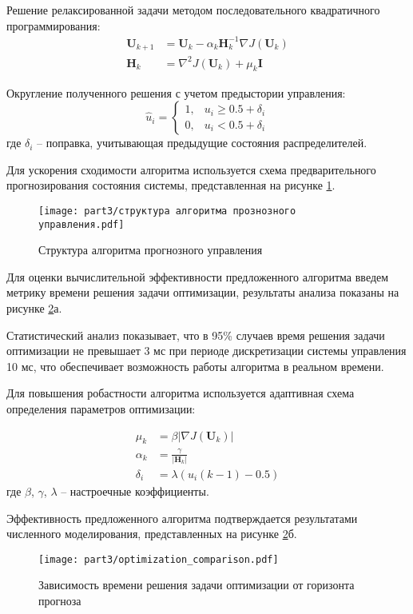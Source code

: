 Решение релаксированной задачи методом последовательного квадратичного программирования:
\begin{equation}
	\begin{aligned}
		\mathbf{U}_{k+1} & = \mathbf{U}_k - \alpha_k \mathbf{H}_k^{-1}\nabla J(\mathbf{U}_k) \\
		\mathbf{H}_k     & = \nabla^2 J(\mathbf{U}_k) + \mu_k\mathbf{I}
	\end{aligned}
\end{equation}

Округление полученного решения с учетом предыстории управления:
\begin{equation}
	\hat{u}_i = \begin{cases}
		1, & u_i \geq 0.5 + \delta_i \\
		0, & u_i < 0.5 + \delta_i
	\end{cases}
\end{equation}
где $\delta_i$ -- поправка, учитывающая предыдущие состояния распределителей.

Для ускорения сходимости алгоритма используется схема предварительного прогнозирования состояния системы, представленная
на рисунке \ref{fig:mpc_structure}.

\begin{figure}[ht]
	\centering
	\texttt{[image: part3/структура алгоритма прознозного управления.pdf]}
	\caption{Структура алгоритма прогнозного управления}\label{fig:mpc_structure}
\end{figure}

Для оценки вычислительной эффективности предложенного алгоритма введем метрику времени решения задачи
оптимизации, результаты анализа показаны на рисунке \ref{fig:opt_compar}а.

Статистический анализ показывает, что в 95\% случаев время решения задачи
оптимизации не превышает 3 мс при периоде дискретизации системы управления
10 мс, что обеспечивает возможность работы алгоритма в реальном времени.

Для повышения робастности алгоритма используется адаптивная схема определения
параметров оптимизации:

\begin{equation}
	\begin{aligned}
		\mu_k    & = \beta|\nabla J(\mathbf{U}_k)| \\
		\alpha_k & = \frac{\gamma}{|\mathbf{H}_k|} \\
		\delta_i & = \lambda(u_i(k-1) - 0.5)
	\end{aligned}
\end{equation}
где $\beta$, $\gamma$, $\lambda$ -- настроечные коэффициенты.

Эффективность предложенного алгоритма подтверждается результатами численного моделирования, представленных на рисунке \ref{fig:opt_compar}б.

\begin{figure}[ht]
	\centering
	\texttt{[image: part3/optimization\_comparison.pdf]}
	\caption{Зависимость времени решения задачи оптимизации от горизонта прогноза}\label{fig:opt_compar}
\end{figure}